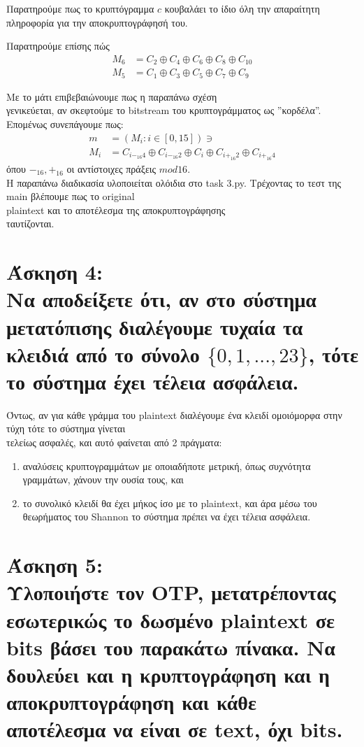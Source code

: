 \documentclass{article}
\newcommand{\lt}[1]{\latintext #1\greektext}
\newcommand{\task}[2]{\newpage\section*{Άσκηση #1:\\#2}}
\begin{document}
Παρατηρούμε πως το κρυπτόγραμμα $c$ κουβαλάει το ίδιο όλη την απαραίτητη πληροφορία για την αποκρυπτογράφησή του.

Παρατηρούμε επίσης πώς
\begin{align*}
    M_6 &= C_2 \oplus C_4 \oplus C_6 \oplus C_8 \oplus C_{10}\\
    M_5 &= C_1 \oplus C_3 \oplus C_5 \oplus C_7 \oplus C_9
\end{align*}

Με το μάτι επιβεβαιώνουμε πως η παραπάνω σχέση\\ γενικεύεται, αν σκεφτούμε το \lt{bitstream} του κρυπτογράμματος ως ''κορδέλα''.\\

Επομένως συνεπάγουμε πως:
\begin{align*}
    m &= (M_i : i\in[0, 15]) \ni\\
    M_i &= C_{i -_{16} 4} \oplus C_{i -_{16} 2} \oplus C_i \oplus C_{i +_{16} 2} \oplus C_{i +_{16} 4}
\end{align*}
όπου $-_{16}, +_{16}$ οι αντίστοιχες πράξεις $mod 16$.\\

Η παραπάνω διαδικασία υλοποιείται ολόιδια στο \lt{task 3.py}.
Τρέχοντας το τεστ της \lt{main} βλέπουμε πως το \lt{original\\ plaintext} και το αποτέλεσμα της αποκρυπτογράφησης\\ ταυτίζονται.

\task{4}{
    Να αποδείξετε ότι, αν στο σύστημα μετατόπισης διαλέγουμε τυχαία τα κλειδιά από το σύνολο $\{0, 1, ..., 23\}$, τότε το σύστημα έχει τέλεια ασφάλεια.
}

Όντως, αν για κάθε γράμμα του \lt{plaintext} διαλέγουμε ένα κλειδί ομοιόμορφα στην τύχη τότε το σύστημα γίνεται\\ τελείως ασφαλές, και αυτό φαίνεται από 2 πράγματα:
\begin{enumerate}
    \item αναλύσεις κρυπτογραμμάτων με οποιαδήποτε μετρική, όπως συχνότητα γραμμάτων, χάνουν την ουσία τους, και
    \item το συνολικό κλειδί θα έχει μήκος ίσο με το \lt{plaintext}, και άρα μέσω του θεωρήματος του \lt{Shannon} το σύστημα πρέπει να έχει τέλεια ασφάλεια.
\end{enumerate}

\task{5}{
    Υλοποιήστε τον \lt{OTP}, μετατρέποντας εσωτερικώς το δωσμένο \lt{plaintext} σε \lt{bits} βάσει του παρακάτω πίνακα. Να δουλεύει και η κρυπτογράφηση και η αποκρυπτογράφηση και κάθε αποτέλεσμα να είναι σε \lt{text}, όχι \lt{bits}.
}
\end{document}
